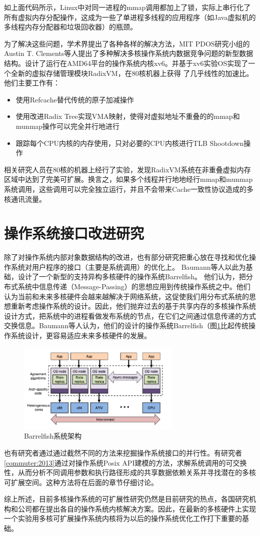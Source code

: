 如上面代码所示，Linux中对同一进程的mmap调用都加上了锁，实际上串行化了所有虚拟内存分配操作，这成为一些了单进程多线程的应用程序（如Java虚拟机的多线程内存分配器和垃圾回收器）的瓶颈。

为了解决这些问题，学术界提出了各种各样的解决方法，MIT
PDOS研究小组的Austin T. Clements等人提出了多种解决多核操作系统内数据竞争问题的新型数据结构\cite{radixvm:eurosys13}。设计了运行在AMD64平台的操作系统内核xv6。并基于xv6实验OS实现了一个全新的虚拟存储管理模块RadixVM，在80核机器上获得
了几乎线性的加速比。他们主要工作有：
\begin{itemize}
\item 使用Refcache替代传统的原子加减操作
\item 使用改进Radix
Tree实现VMA映射，使得对虚拟地址不重叠的的mmap和munmap操作可以完全并行地进行
\item 跟踪每个CPU内核的内存使用，只对必要的CPU内核进行TLB Shootdown操作
\end{itemize}

相关研究人员在80核的机器上经行了实验，发现RadixVM系统在非重叠虚拟内存区域中达到了完美可扩展。换言之，如果多个线程并行地地经行mmap和munmap系统调用，这些调用可以完全独立运行，并且不会带来Cache一致性协议造成的多核通讯流量。

\section{操作系统接口改进研究}
除了对操作系统内部对象数据结构的改进，也有部分研究把重心放在寻找和优化操作系统对用户程序的接口（主要是系统调用）的优化上。
Baumann等人以此为基础，设计了一个新型的支持异构多核硬件的操作系统Barrelfish\cite{Baumann:2009:MNO:1629575.1629579}。
他们认为，把分布式系统中信息传递（Message-Passing）的思想应用到传统操作系统之中。他们认为当前和未来多核硬件会越来越解决于网络系统，这促使我们用分布式系统的思想重新考虑操作系统的设计。因此，他们抛弃过去的基于共享内存的多核操作系统设计方式，把系统中的进程看做发布系统的节点，在它们之间通过信息传递的方式交换信息。Baumann等人认为，他们的设计的操作系统Barrelfish（图\ref{fig:barrelfish}比起传统操作系统设计，更容易适应未来多核硬件的发展。

\begin{figure}[ht]
\begin{center}
\includegraphics[width=0.7\textwidth]{figures/barrelfish.png}
\end{center}
\caption{Barrelfish系统架构\cite{Baumann:2009:MNO:1629575.1629579}}
\label{fig:barrelfish}
\end{figure}

也有研究者通过通过截然不同的方法来挖掘操作系统接口的并行性。有研究者\ref{commuter:2013}通过对操作系统Posix API建模的方法，求解系统调用的可交换性，从而分析不同调用参数和执行路径形成的共享数据依赖关系并寻找潜在的多核可扩展空间。这种方法将在后面的章节仔细讨论。

综上所述，目前多核操作系统的可扩展性研究仍然是目前研究的热点，各国研究机构和公司都在提出各自的操作系统内核解决方案。因此，在最新的多核硬件上实现一个实验用多核可扩展操作系统内核将为以后的操作系统优化工作打下重要的基础。


